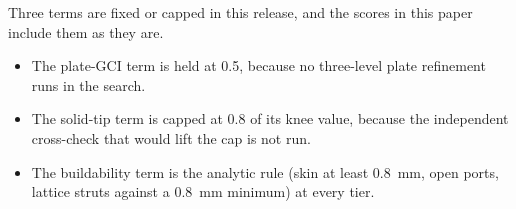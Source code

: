 Three terms are fixed or capped in this release, and the scores in this paper include them as they are.
\begin{itemize}
\item The plate-GCI term is held at 0.5, because no three-level plate refinement runs in the search.
\item The solid-tip term is capped at 0.8 of its knee value, because the independent cross-check that would lift the cap
is not run.
\item The buildability term is the analytic rule (skin at least 0.8~mm, open ports, lattice struts against a 0.8~mm
minimum) at every tier.
\end{itemize}
